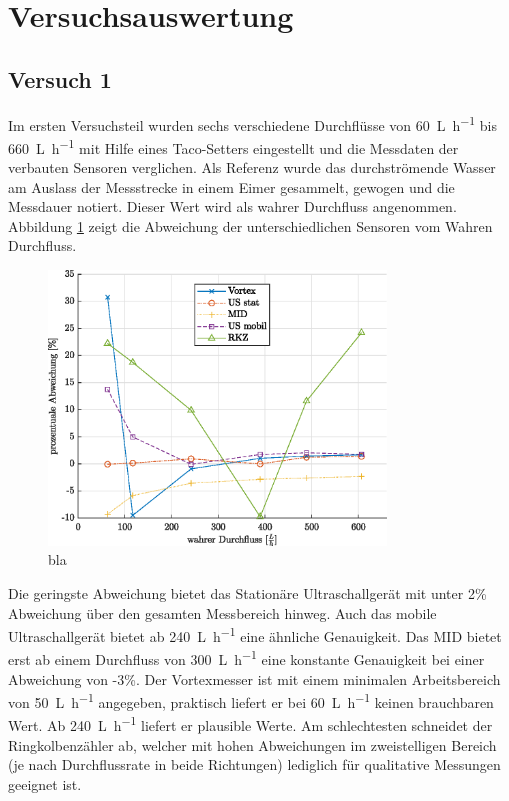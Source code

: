 \section{Versuchsauswertung}

\subsection{Versuch 1}
Im ersten Versuchsteil wurden sechs verschiedene Durchflüsse von \SI{60}{\liter\per\hour} bis \SI{660}{\liter\per\hour} mit Hilfe eines Taco-Setters eingestellt und die Messdaten der verbauten Sensoren verglichen. Als Referenz wurde das durchströmende Wasser am Auslass der Messstrecke in einem Eimer gesammelt, gewogen und die Messdauer notiert. Dieser Wert wird als wahrer Durchfluss angenommen. Abbildung \ref{fig:devPc} zeigt die Abweichung der unterschiedlichen Sensoren vom Wahren Durchfluss. 
\begin{figure}[H]
	\centering
	\includegraphics[width=0.8\textwidth]{../DATA/devPcPlot.eps}
	\caption[bla]{bla}
	\label{fig:devPc}
\end{figure}
Die geringste Abweichung bietet das Stationäre Ultraschallgerät mit unter 2\% Abweichung über den gesamten Messbereich hinweg. Auch das mobile Ultraschallgerät bietet ab \SI{240}{\liter\per\hour} eine ähnliche Genauigkeit. Das MID bietet erst ab einem Durchfluss von \SI{300}{\liter\per\hour} eine konstante Genauigkeit bei einer Abweichung von -3\%. Der Vortexmesser ist mit einem minimalen Arbeitsbereich von \SI{50}{\liter\per\hour} angegeben, praktisch liefert er bei \SI{60}{\liter\per\hour} keinen brauchbaren Wert. Ab \SI{240}{\liter\per\hour} liefert er plausible Werte. Am schlechtesten schneidet der Ringkolbenzähler ab, welcher mit hohen Abweichungen im zweistelligen Bereich (je nach Durchflussrate in beide Richtungen) lediglich für qualitative Messungen geeignet ist.

